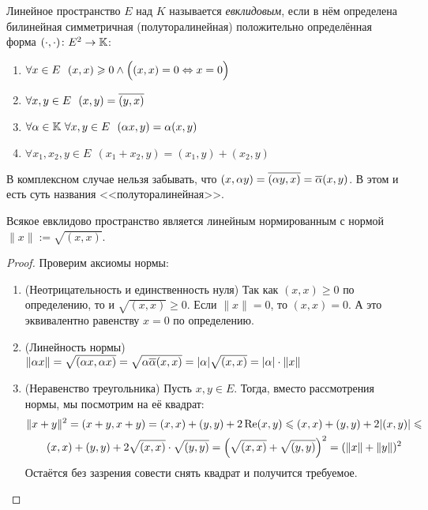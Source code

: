 \begin{definition}
	Линейное пространство $E$ над $K$ называется \textit{евклидовым}, если в нём определена билинейная симметричная (полуторалинейная) положительно определённая форма $(\cdot, \cdot) \colon E^2 \to \mathbb{K}$:
	\begin{enumerate}
		\item $\forall x \in E\ \ (x, x) \geqslant 0 \wedge \Big((x, x) = 0 \Leftrightarrow x = 0\Big)$
		
		\item $\forall x, y \in E\ \ (x, y) = \overline{(y, x)}$
		
		\item $\forall \alpha \in \mathbb{K}\ \forall x, y \in E\ \ (\alpha x, y) = \alpha(x, y)$
		
		\item $\forall x_1, x_2, y \in E\ \ (x_1 + x_2, y) = (x_1, y) + (x_2, y)$
	\end{enumerate}
\end{definition}

\begin{anote}
	В комплексном случае нельзя забывать, что $(x, \alpha y) = \overline{(\alpha y, x)} = \overline{\alpha}(x, y)$. В этом и есть суть названия <<полуторалинейная>>.
\end{anote}

\begin{proposition}
	Всякое евклидово пространство является линейным нормированным с нормой $\|x\| := \sqrt{(x, x)}$.
\end{proposition}

\begin{proof}
	Проверим аксиомы нормы:
	\begin{enumerate}
		\item (Неотрицательность и единственность нуля) Так как $(x, x) \ge 0$ по определению, то и $\sqrt{(x, x)} \ge 0$. Если $\|x\| = 0$, то $(x, x) = 0$. А это эквивалентно равенству $x = 0$ по определению.
		
		\item (Линейность нормы) $\|\alpha x\| = \sqrt{(\alpha x, \alpha x)} = \sqrt{\alpha\overline{\alpha}(x, x)} = |\alpha|\sqrt{(x, x)} = |\alpha| \cdot \|x\|$
		
		\item (Неравенство треугольника) Пусть $x, y \in E$. Тогда, вместо рассмотрения нормы, мы посмотрим на её квадрат:
		\begin{multline*}
			\|x + y\|^2 = (x + y, x + y) = (x, x) + (y, y) + 2\operatorname{Re} (x, y) \leqslant (x, x) + (y, y) + 2|(x, y)| \leqslant
			\\
			(x, x) + (y, y) + 2\sqrt{(x, x)} \cdot \sqrt{(y, y)} = \left(\sqrt{(x, x)} + \sqrt{(y, y)}\right)^2 = (\|x\| + \|y\|)^2
		\end{multline*}
		Остаётся без зазрения совести снять квадрат и получится требуемое.
	\end{enumerate}
\end{proof}

